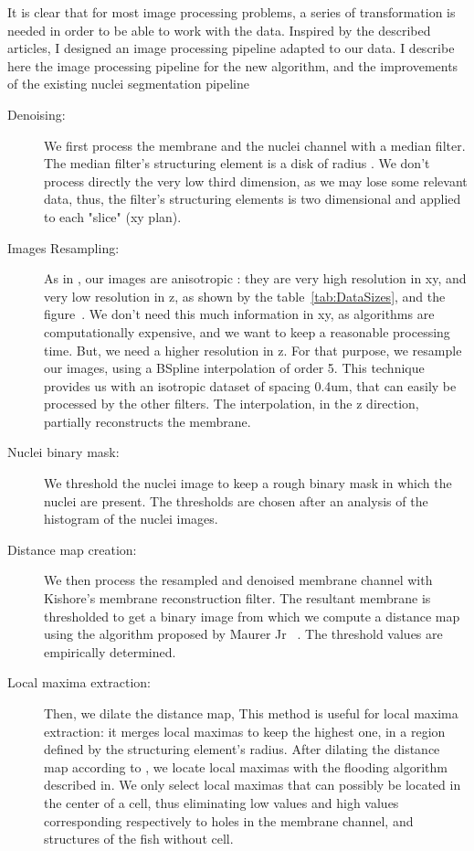 It is clear that for most image processing problems, a series of transformation is needed in order to be able to work with the data.
Inspired by the described articles, I designed an image processing pipeline adapted to our data.
I describe here the image processing pipeline for the new algorithm, and the improvements of the existing nuclei segmentation pipeline
\begin{description}
  \item[Denoising: ] We first process the membrane and the nuclei channel with a median filter. The median filter's structuring element is a disk of radius
  .
  We don't process directly the very low third dimension, as we may lose some relevant data,
  thus, the filter's structuring elements is two dimensional and applied to each "slice" (xy plan).
%
%
  \item[Images Resampling: ] As in \cite{li20073}, our images are anisotropic : they are very high resolution in xy, and very low resolution in z, as shown by the
  table~\ref{tab:DataSizes}, and the figure~.
  We don't need this much information in xy, as algorithms are computationally expensive, and we want to keep a reasonable processing time.
  But, we need a higher resolution in z.
  For that purpose, we resample our images, using a BSpline interpolation of order 5.
  This technique provides us with an isotropic dataset of spacing 0.4um, that can easily be
  processed by the other filters. The interpolation, in the z direction, partially reconstructs the membrane.
%
%
  \item[Nuclei binary mask: ] We threshold the nuclei image to keep a rough binary mask in which the nuclei are present.
  The thresholds are chosen after an analysis of the histogram of the nuclei images.
%  
%
%  
  \item[Distance map creation: ] We then process the resampled and denoised membrane channel with Kishore's membrane reconstruction filter.
  The resultant membrane is thresholded to get a binary image from which we compute a distance map
  using the algorithm proposed by Maurer Jr {\etal}~\cite{maurer2003linear}.
  The threshold values are empirically determined.
%  
%
%
  \item[Local maxima extraction: ] Then, we dilate the distance map, This method is useful for local maxima extraction:
  it merges local maximas to keep the highest one, in a region defined by the structuring element's radius.
  After dilating the distance map according to , we locate local maximas with the flooding algorithm described in\cite{beare2005finding}.
  We only select local maximas that can possibly be located in the center of a cell, thus eliminating low values and high values corresponding respectively to holes in the membrane channel, and structures of the fish without cell.
%  
%
%
\end{description}


